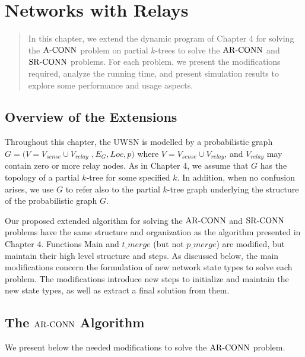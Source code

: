 \chapter{Networks with Relays}
\begin{quote}
In this chapter, we extend the dynamic program of Chapter 4 for solving the ${\mathrm {A\mbox{-}CONN}}$ problem on partial $k$-trees to solve the ${\mathrm {AR\mbox{-}CONN}}$ and ${\mathrm {SR\mbox{-}CONN}}$ problems. For each problem, we present the modifications required, analyze the running time, and present simulation results to explore some performance and usage aspects.
\end{quote}


\section{Overview of the Extensions}
\label{sec:overviewExt}
Throughout this chapter, the UWSN is modelled by a probabilistic graph $G=(V=V_{sense}\cup V_{relay}$ $,E_G,Loc,p)$ where $V=V_{sense}\cup V_{relay}$, and $V_{relay}$ may contain zero or more relay nodes. As in Chapter 4, we assume that $G$ has the topology of a partial $k$-tree for some specified $k$. In addition, when no confusion arises, we use $G$ to refer also to the partial $k$-tree graph underlying the structure of the probabilistic graph $G$.

%
Our proposed extended algorithm for solving the ${\mathrm {AR\mbox{-}CONN}}$ and  ${\mathrm {SR\mbox{-}CONN}}$ problems have the same structure and organization as the algorithm presented in Chapter 4.
%
Functions Main and $t\_merge$ (but not $p\_merge$) are modified, but maintain their high level structure and steps.
As discussed below, the main modifications concern the formulation of new network state types to solve each problem. The modifications introduce new steps to initialize and maintain the new state types, as well as extract a final solution from them.

\section{The ${\mathrm {AR\mbox{-}CONN}}$ Algorithm}
\label{sec:arconnalg}
We present below the needed modifications to solve the ${\mathrm {AR\mbox{-}CONN}}$ problem.
